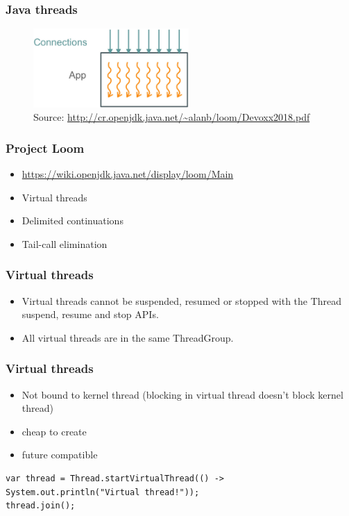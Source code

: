 \documentclass[10pt,utf8]{beamer}
\begin{document}
\begin{frame}
    \frametitle{Java threads    }
    \begin{figure}
        \centering
        \includegraphics[height=3cm]{./img/virt_threads.eps}
        \caption{\tiny{Source: \url{http://cr.openjdk.java.net/~alanb/loom/Devoxx2018.pdf}}}
    \end{figure}
\end{frame}

\begin{frame}
  \frametitle{Project Loom}
	\begin{itemize}
		\item \url{https://wiki.openjdk.java.net/display/loom/Main}
		\item Virtual threads
		\item Delimited continuations
		\item Tail-call elimination
	\end{itemize}
\end{frame}

\begin{frame}
  \frametitle{Virtual threads}
	\begin{itemize}
		\item Virtual threads cannot be suspended, resumed or stopped with the Thread suspend, resume and stop APIs.
		\item All virtual threads are in the same ThreadGroup.
	\end{itemize}
\end{frame}

\begin{frame}[fragile]
	\frametitle{Virtual threads}
        \begin{itemize}
            \item Not bound to kernel thread (blocking in virtual thread doesn't block kernel thread)
            \item cheap to create
            \item future compatible
        \end{itemize}

	\begin{lstlisting}[style=java]
var thread = Thread.startVirtualThread(() -> System.out.println("Virtual thread!"));
thread.join();
	\end{lstlisting}
\end{frame}
\end{document}
